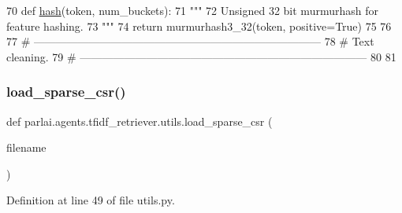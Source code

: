 \begin{DoxyCode}
70 \textcolor{keyword}{def }\hyperlink{namespaceparlai_1_1agents_1_1tfidf__retriever_1_1utils_a6df58709964913e04733db89d6e187db}{hash}(token, num\_buckets):
71     \textcolor{stringliteral}{"""}
72 \textcolor{stringliteral}{    Unsigned 32 bit murmurhash for feature hashing.}
73 \textcolor{stringliteral}{    """}
74     \textcolor{keywordflow}{return} murmurhash3\_32(token, positive=\textcolor{keyword}{True}) %
75 
76 
77 \textcolor{comment}{# ------------------------------------------------------------------------------}
78 \textcolor{comment}{# Text cleaning.}
79 \textcolor{comment}{# ------------------------------------------------------------------------------}
80 
81 
\end{DoxyCode}
\mbox{\label{namespaceparlai_1_1agents_1_1tfidf__retriever_1_1utils_ac866d85f1378528cb12c8d13b959d279}} 
\subsubsection{\texorpdfstring{load\+\_\+sparse\+\_\+csr()}{load\_sparse\_csr()}}
{\footnotesize\ttfamily def parlai.\+agents.\+tfidf\+\_\+retriever.\+utils.\+load\+\_\+sparse\+\_\+csr (\begin{DoxyParamCaption}\item[{}]{filename }\end{DoxyParamCaption})}



Definition at line 49 of file utils.\+py.


